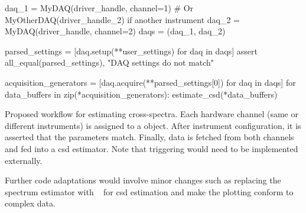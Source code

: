 \begin{listing}[htpb]
    \begin{py}
        daq_1 = MyDAQ(driver_handle, channel=1)
        # Or MyOtherDAQ(driver_handle_2) if another instrument
        daq_2 = MyDAQ(driver_handle, channel=2)
        daqs = (daq_1, daq_2)

        parsed_settings = [daq.setup(**user_settings) for daq in daqs]
        assert all_equal(parsed_settings), "DAQ settings do not match"

        acquisition_generators = [daq.acquire(**parsed_settings[0])
                                  for daq in daqs]
        for data_buffers in zip(*acquisition_generators):
            estimate_csd(*data_buffers)
    \end{py}
    \caption[Proposed  workflow for cross-spectra]{
        Proposed  workflow for estimating cross-spectra.
        Each hardware channel (same or different instruments) is assigned to a  object.
        After instrument configuration, it is asserted that the parameters match.
        Finally, data is fetched from both channels and fed into a \gls{csd} estimator.
        Note that triggering would need to be implemented externally.
    }
    \label{lst:speck:conclusion:cross_workflow}
\end{listing}

Further code adaptations would involve minor changes such as replacing the spectrum estimator with ~ for \gls{csd} estimation
and make the plotting conform to complex data.
